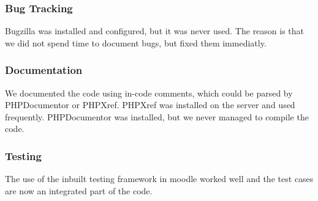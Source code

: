 \subsubsection{Bug Tracking}
Bugzilla was installed and configured, but it was never used. 
The reason is that we did not spend time to document bugs, but fixed them immediatly. 

\subsubsection{Documentation}
We documented the code using in-code comments, which could be parsed by PHPDocumentor or PHPXref. 
PHPXref was installed on the server and used frequently. 
PHPDocumentor was installed, but we never managed to compile the code. 



\subsubsection{Testing}
The use of the inbuilt testing framework in moodle worked well and the test cases are now an integrated part of the code.






